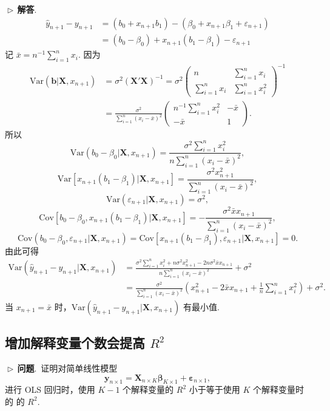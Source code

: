 \documentclass{article}
\newcommand{\Var}{\mathrm{Var}}
\newcommand{\Cov}{\mathrm{Cov}}
\newcommand{\y}{\mathbf{y}}
\newcommand{\X}{\mathbf{X}}
\newcommand{\0}{\mathbf{0}}
\newcommand{\vbe}{\bm{\beta}}
\newcommand{\ve}{\bm{\varepsilon}}
\newcommand{\vb}{\mathbf{b}}
\newcommand{\pro}{\noindent$\vartriangleright\,$\textbf{问题}.\ }
\newcommand{\sol}{\noindent$\vartriangleright\,$\textbf{解答}.\ }
\begin{document}
\sol
\begin{align*}
\hat{y}_{n+1}-y_{n+1}&=(b_0+x_{n+1}b_1)-(\beta_0+x_{n+1}\beta_1+\varepsilon_{n+1})\\
&=(b_0-\beta_0)+x_{n+1}(b_1-\beta_1)-\varepsilon_{n+1}
\end{align*}
记 $\bar{x}=n^{-1}\sum_{i=1}^{n}x_i$. 因为
\begin{align*}
\Var(\vb|\X,x_{n+1})&=\sigma^2(\X'\X)^{-1}=\sigma^2
\begin{pmatrix}
n& \sum\limits_{i=1}^{n}x_i\\
\sum\limits_{i=1}^{n}x_i& \sum\limits_{i=1}^{n}x_i^2
\end{pmatrix}^{-1}\\
&=\frac{\sigma^2}{\sum\limits_{i=1}^{n}(x_i-\bar{x})^2}
\begin{pmatrix}
n^{-1}\sum\limits_{i=1}^{n}x_i^2& -\bar{x}\\
 -\bar{x}& 1
\end{pmatrix}.
\end{align*}
所以
\[
\Var(b_0-\beta_0|\X,x_{n+1})=\frac{\sigma^2\sum\limits_{i=1}^{n}x_i^2}{n\sum\limits_{i=1}^{n}(x_i-\bar{x})^2},
\]
\[
\Var[x_{n+1}(b_1-\beta_1)|\X,x_{n+1}]=\frac{\sigma^2x_{n+1}^2}{\sum\limits_{i=1}^{n}(x_i-\bar{x})^2},
\]
\[
\Var(\varepsilon_{n+1}|\X,x_{n+1})=\sigma^2,
\]
\[
\Cov[b_0-\beta_0,x_{n+1}(b_1-\beta_1)|\X,x_{n+1}]=-\frac{\sigma^2\bar{x}x_{n+1}}{\sum\limits_{i=1}^{n}(x_i-\bar{x})^2},
\]
\[
\Cov(b_0-\beta_0,\varepsilon_{n+1}|\X,x_{n+1})=\Cov[x_{n+1}(b_1-\beta_1),\varepsilon_{n+1}|\X,x_{n+1}]=0.
\]
由此可得
\begin{align*}
\Var(\hat{y}_{n+1}-y_{n+1}|\X,x_{n+1})&=\frac{\sigma^2\sum\limits_{i=1}^{n}x_i^2+n\sigma^2x_{n+1}^2-2n\sigma^2\bar{x}x_{n+1}}{n\sum\limits_{i=1}^{n}(x_i-\bar{x})^2}+\sigma^2\\
&=\frac{\sigma^2}{\sum\limits_{i=1}^{n}(x_i-\bar{x})^2}\left(x_{n+1}^2-2\bar{x}x_{n+1}+\frac{1}{n}\sum\limits_{i=1}^{n}x_i^2\right)+\sigma^2.
\end{align*}
当 $x_{n+1}=\bar{x}$ 时，$\Var(\hat{y}_{n+1}-y_{n+1}|\X,x_{n+1})$ 有最小值.

\subsection{增加解释变量个数会提高 $R^2$}
\pro 证明对简单线性模型
\[
\y_{n\times1} = \X_{n\times K} \vbe_{K\times1} +\ve_{n\times1}, 
\]
进行 OLS 回归时，使用 $K-1$ 个解释变量的 $R^2$ 小于等于使用 $K$ 个解释变量时的 的 $R^2$.\\
\end{document}
